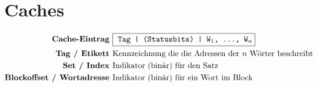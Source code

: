 \documentclass{article}
\begin{document}
	\section*{Caches}
		\begin{align*}
			\textbf{Cache-Eintrag } & \noindent\fbox{
			\texttt{Tag | (Statusbits) | W$_1$, \ldots, W$_n$}}\\
			\textbf{Tag / Etikett } & \text{Kennzeichnung die die Adressen der $n$ W\"orter beschreibt}\\
			\textbf{Set / Index } & \text{Indikator (bin\"ar) f\"ur den Satz}\\
			\textbf{Blockoffset / Wortadresse } & \text{Indikator (bin\"ar) f\"ur ein Wort im Block}\\
		\end{align*}
\end{document}
